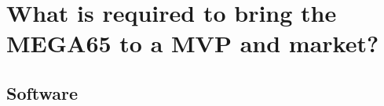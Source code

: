 
\chapter{What is required to bring the MEGA65 to a MVP and market?}
\label{Chapter7}

\section{Software}
